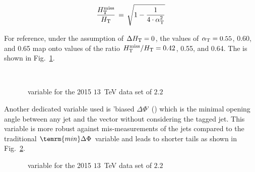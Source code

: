 \begin{equation}
  \label{eq:alphat3}
  \frac{\mbox{$H_{\rm T}^{\rm miss}$}}{\mbox{$H_\text{T}$}} \, = \, \sqrt{ 1 - \frac{1}{4 \cdot \alpha_{\text{T}}^2} }
\end{equation}

For reference, under the assumption of $\Delta\mbox{$H_\text{T}$} = 0$, the values of $\alpha_{\text{T}} = 0.55$, 0.60, and 0.65 map onto values of the ratio
$\mbox{$H_{\rm T}^{\rm miss}$}/\mbox{$H_\text{T}$} = 0.42$, 0.55, and 0.64. The \alphat is shown in Fig.~\ref{fig:strategy_alphaT}.


\begin{figure}
    \begin{center}
         ~~
        \caption{\alphat~variable for the 2015 $13$~TeV data set of $2.2$\ifb}
        \label{fig:strategy_alphaT}
    \end{center}
\end{figure}


Another dedicated variable used is 'biased $\Delta \Phi$' (\bdphi) which is the minimal opening angle between any jet and the \mht vector without considering the tagged jet. This variable is more robust against mis-measurements of the jets compared to the traditional $\temrm{min}\Delta \Phi$ variable and leads to shorter tails as shown in Fig.~\ref{fig:strategy_bdphi}.

 \begin{figure}
    \begin{center}
        \caption{\bdphi~variable for the 2015 $13$~TeV data set of $2.2$\ifb}
        \label{fig:strategy_bdphi}
    \end{center}
\end{figure}

